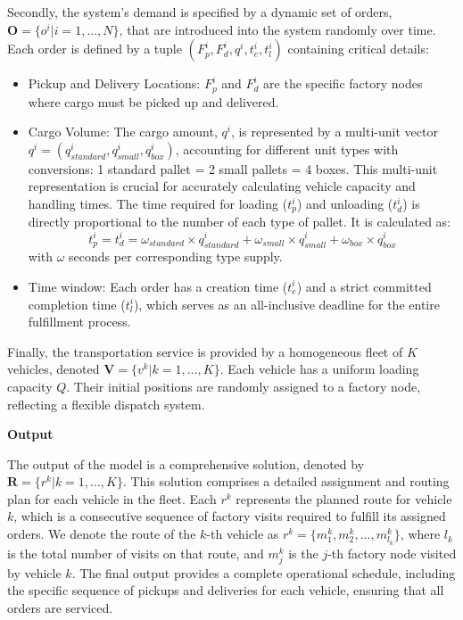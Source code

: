 \documentclass[preprint,12pt]{elsarticle}
\begin{document}
Secondly, the system's demand is specified by a dynamic set of orders, $\textbf{O} = \{o^i | i = 1, \dots, N\}$, that are introduced into the system randomly over time. Each order is defined by a tuple $(F_{p}^i, F_{d}^i, q^i, t_{e}^i, t_{l}^i)$ containing critical details:
\begin{itemize}
    \item Pickup and Delivery Locations: $F_{p}^i$ and $F_{d}^i$ are the specific factory nodes where cargo must be picked up and delivered.
    
    \item Cargo Volume: The cargo amount, $q^i$, is represented by a multi-unit vector $q^i = (q_{standard}^i, q_{small}^i, q_{box}^i)$, accounting for different unit types with conversions: 1 standard pallet = 2 small pallets = 4 boxes. This multi-unit representation is crucial for accurately calculating vehicle capacity and handling times. The time required for loading ($t_p^i$) and unloading ($t_d^i$) is directly proportional to the number of each type of pallet. It is calculated as:
\begin{equation}
t_p^i = t_d^i = \omega_{standard} \times q_{standard}^i 
+ \omega_{small} \times q_{small}^i 
+ \omega_{box} \times q_{box}^i
\end{equation}
    with $\omega$ seconds per corresponding type supply. 
    
    \item Time window: Each order has a creation time ($t_{e}^i$) and a strict committed completion time ($t_{l}^i$), which serves as an all-inclusive deadline for the entire fulfillment process.
\end{itemize}

Finally, the transportation service is provided by a homogeneous fleet of $K$ vehicles, denoted $\textbf{V} = \{v^k | k = 1, \dots, K\}$. Each vehicle has a uniform loading capacity $Q$. Their initial positions are randomly assigned to a factory node, reflecting a flexible dispatch system. 

\textbf{Output}

The output of the model is a comprehensive solution, denoted by $\textbf{R} = \{r^k | k = 1, \dots, K\}$. This solution comprises a detailed assignment and routing plan for each vehicle in the fleet. Each $r^k$ represents the planned route for vehicle $k$, which is a consecutive sequence of factory visits required to fulfill its assigned orders. We denote the route of the $k$-th vehicle as $r^k = \{m_1^k, m_2^k, \dots, m_{l_k}^k\}$, where $l_k$ is the total number of visits on that route, and $m_j^k$ is the $j$-th factory node visited by vehicle $k$. The final output provides a complete operational schedule, including the specific sequence of pickups and deliveries for each vehicle, ensuring that all orders are serviced.
\end{document}
